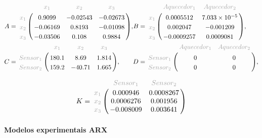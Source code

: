 \begin{equation*}
	\begin{aligned}
		A &= \bbordermatrix{
											&	\textcolor{matrixtitle}{x_1}	&	\textcolor{matrixtitle}{x_2}	&	\textcolor{matrixtitle}{x_3}	\cr
			\textcolor{matrixtitle}{x_1}	&	0.9099							&	-0.02543						&	-0.02673	 					\cr
			\textcolor{matrixtitle}{x_2}	&	-0.06169						&	0.8193							&	-0.01098	 					\cr
			\textcolor{matrixtitle}{x_3}	&	-0.03506						&	0.108							&	0.9884		 					\cr
		}
		, \\
		C &= \bbordermatrix{
												&	\textcolor{matrixtitle}{x_1}	&	\textcolor{matrixtitle}{x_2}	&	\textcolor{matrixtitle}{x_3}	\cr
			\textcolor{matrixtitle}{Sensor_1}	&	180.1							&	8.69							&	1.814							\cr
			\textcolor{matrixtitle}{Sensor_2}	&	159.2							&	-40.71							&	1.665							\cr
		}
		,
	\end{aligned}
	\begin{aligned}
		B &= \bbordermatrix{
											&	\textcolor{matrixtitle}{Aquecedor_1}	&	\textcolor{matrixtitle}{Aquecedor_2}	\cr
			\textcolor{matrixtitle}{x_1}	&	0.0005512								&	7.033 \times 10^{-5}					\cr
			\textcolor{matrixtitle}{x_2}	&	0.002047								&	-0.001209								\cr
			\textcolor{matrixtitle}{x_3}	&	-0.0009257								&	0.0009081								\cr
		}
		, \\
		D &= \bbordermatrix{
												&	\textcolor{matrixtitle}{Aquecedor_1}	&	\textcolor{matrixtitle}{Aquecedor_2}	\cr
			\textcolor{matrixtitle}{Sensor_1}	&	0           							&	0										\cr
			\textcolor{matrixtitle}{Sensor_2}	&	0           							&	0										\cr
		}
		,
	\end{aligned}
\end{equation*}

\begin{equation*}
	K = \bbordermatrix{
										&	\textcolor{matrixtitle}{Sensor_1}	&	\textcolor{matrixtitle}{Sensor_2}	\cr
		\textcolor{matrixtitle}{x_1}	&	0.000946							&	0.0008267							\cr
		\textcolor{matrixtitle}{x_2}	&	0.0006276							&	0.001956							\cr
		\textcolor{matrixtitle}{x_3}	&	-0.008009							&	0.003641							\cr
	}
\end{equation*}

\paragraph*{\textbf{Modelos experimentais ARX}}
\label{par:modelos_experimentais_arx}

